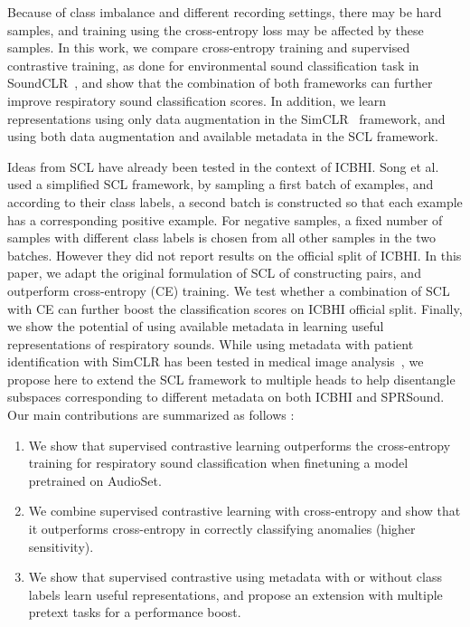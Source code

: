 \documentclass{article}
\begin{document}
\begin{sloppy}
Because of class imbalance and different recording settings, there may be hard samples, and training using the cross-entropy loss may be affected by these samples. In this work, we compare cross-entropy training and supervised contrastive training, as done for environmental sound classification task in SoundCLR~\cite{soundclr}, and show that the combination of both frameworks can further improve respiratory sound classification scores. In addition, we learn representations using only data augmentation in the SimCLR~\cite{chen2020simple} framework, and using both data augmentation and available metadata in the SCL framework.

Ideas from SCL have already been tested in the context of ICBHI. Song et al.~\cite{9414385} used a simplified SCL framework, by sampling a first batch of examples, and according to their class labels, a second batch is constructed so that each example has a corresponding positive example. For negative samples, a fixed number of samples with different class labels is chosen from all other samples in the two batches.  However they did not report results on the official split of ICBHI. In this paper, we adapt the original formulation of SCL of constructing pairs, and outperform cross-entropy (CE) training. We test whether a combination of SCL with CE can further boost the classification scores on ICBHI official split. Finally, we show the potential of using available metadata in learning useful representations of respiratory sounds. While using metadata with patient identification with SimCLR has been tested in medical image analysis~\cite{pmlr-v149-vu21a}, we propose here to extend the SCL framework to multiple heads to help disentangle subspaces corresponding to different metadata on both ICBHI and SPRSound.
Our main contributions are summarized as follows : 
\begin{enumerate}
    \item We show that supervised contrastive learning outperforms the cross-entropy training for respiratory sound classification when finetuning a model pretrained on AudioSet.
    \item We combine supervised contrastive learning with cross-entropy and show that it outperforms cross-entropy in correctly classifying anomalies (higher sensitivity).
    \item We show that supervised contrastive using metadata with or without class labels learn useful representations, and propose an extension with multiple pretext tasks for a performance boost.
\end{enumerate}


\end{sloppy}
\end{document}
